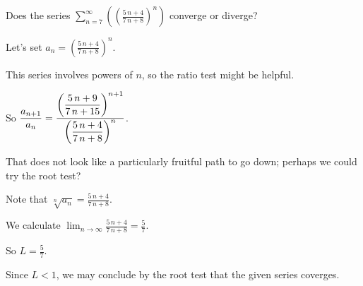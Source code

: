 \documentclass{ximera}
\begin{document}
\begin{question}
  Does the series \(\displaystyle\sum_{n=7}^\infty \left( \left(\displaystyle\frac{5 \, n + 4}{7 \, n + 8}\right)^{n} \right)\) converge or diverge?

  \begin{solution}
    \begin{hint}
      Let's set \(a_n = \left(\displaystyle\frac{5 \, n + 4}{7 \, n + 8}\right)^{n}\).
    \end{hint}
    \begin{hint}
      This series involves powers of \(n\), so the ratio test might be helpful.
    \end{hint}
    \begin{hint}
      So \(\displaystyle\displaystyle\frac{a_{n+1}}{a_n} = \displaystyle\frac{\left(\displaystyle\frac{5 \, n + 9}{7 \, n + 15}\right)^{n + 1}}{\left(\displaystyle\frac{5 \, n + 4}{7 \, n + 8}\right)^{n}}\).
    \end{hint}
    \begin{hint}
      That does not look like a particularly fruitful path to go down; perhaps we could try the root test?
    \end{hint}
    \begin{hint}
      Note that \(\sqrt[n]{a_{n}} = \displaystyle\frac{5 \, n + 4}{7 \, n + 8}\).
    \end{hint}
    \begin{hint}
      We calculate \(\lim_{n \to \infty} \displaystyle\frac{5 \, n + 4}{7 \, n + 8} = \displaystyle\frac{5}{7}\).
    \end{hint}
    \begin{hint}
      So \(L = \displaystyle\frac{5}{7}\).
    \end{hint}
    \begin{hint}
      Since \(L < 1\), we may conclude by the root test that the given series coverges.
    \end{hint}


    \begin{multiple-choice}
    \end{multiple-choice}
  \end{solution}

\end{question}
            
\end{document}
